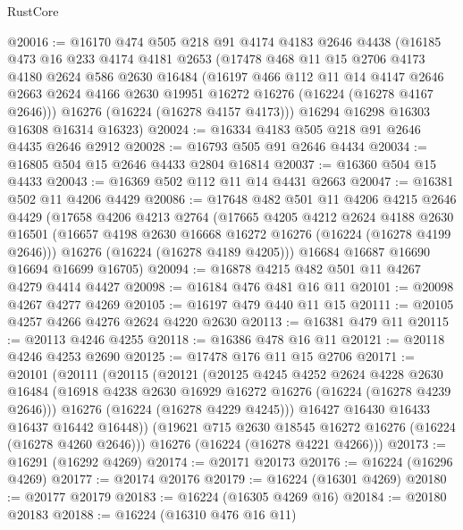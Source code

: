 \begin{lexlean}{RustCore}
\begin{coremodule}
@20016 := @16170
    @474
    @505
    @218
    @91
    @4174
    @4183
    @2646
    @4438
    (@16185
      @473
      @16
      @233
      @4174
      @4181
      @2653
      (@17478
        @468
        @11
        @15
        @2706
        @4173
        @4180
        @2624
        @586
        @2630
        @16484
        (@16197
          @466
          @112
          @11
          @14
          @4147
          @2646
          @2663
          @2624
          @4166
          @2630
          @19951
          @16272
          @16276
          (@16224 (@16278 @4167 @2646)))
        @16276
        (@16224 (@16278 @4157 @4173)))
      @16294
      @16298
      @16303
      @16308
      @16314
      @16323)
@20024 := @16334 @4183 @505 @218 @91 @2646 @4435 @2646 @2912
@20028 := @16793 @505 @91 @2646 @4434
@20034 := @16805 @504 @15 @2646 @4433 @2804 @16814
@20037 := @16360 @504 @15 @4433
@20043 := @16369 @502 @112 @11 @14 @4431 @2663
@20047 := @16381 @502 @11 @4206 @4429
@20086 := @17648
    @482
    @501
    @11
    @4206
    @4215
    @2646
    @4429
    (@17658
      @4206
      @4213
      @2764
      (@17665
        @4205
        @4212
        @2624
        @4188
        @2630
        @16501
        (@16657 @4198 @2630 @16668 @16272 @16276 (@16224 (@16278 @4199 @2646)))
        @16276
        (@16224 (@16278 @4189 @4205)))
      @16684
      @16687
      @16690
      @16694
      @16699
      @16705)
@20094 := @16878 @4215 @482 @501 @11 @4267 @4279 @4414 @4427
@20098 := @16184 @476 @481 @16 @11
@20101 := @20098 @4267 @4277 @4269
@20105 := @16197 @479 @440 @11 @15
@20111 := @20105 @4257 @4266 @4276 @2624 @4220 @2630
@20113 := @16381 @479 @11
@20115 := @20113 @4246 @4255
@20118 := @16386 @478 @16 @11
@20121 := @20118 @4246 @4253 @2690
@20125 := @17478 @176 @11 @15 @2706
@20171 := @20101
    (@20111
      (@20115
        (@20121
          (@20125
            @4245
            @4252
            @2624
            @4228
            @2630
            @16484
            (@16918 @4238 @2630 @16929 @16272 @16276 (@16224 (@16278 @4239 @2646)))
            @16276
            (@16224 (@16278 @4229 @4245)))
          @16427
          @16430
          @16433
          @16437
          @16442
          @16448))
      (@19621 @715 @2630 @18545 @16272 @16276 (@16224 (@16278 @4260 @2646)))
      @16276
      (@16224 (@16278 @4221 @4266)))
@20173 := @16291 (@16292 @4269)
@20174 := @20171 @20173
@20176 := @16224 (@16296 @4269)
@20177 := @20174 @20176
@20179 := @16224 (@16301 @4269)
@20180 := @20177 @20179
@20183 := @16224 (@16305 @4269 @16)
@20184 := @20180 @20183
@20188 := @16224 (@16310 @476 @16 @11)

\end{coremodule}
\end{lexlean}
